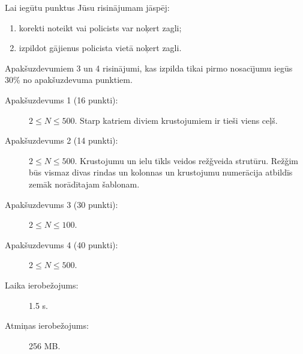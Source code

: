 \documentclass{boi2014-lv}
\begin{document}
    \Scoring
	Lai iegūtu punktus Jūsu risinājumam jāspēj:
    \begin{enumerate}
    	\item korekti noteikt vai policists var noķert zagli;%
	\item izpildot gājienus policista vietā noķert zagli.%
    \end{enumerate}
    
	Apakšuzdevumiem 3 un 4 risinājumi, kas izpilda tikai pirmo nosacījumu iegūs 30\% no apakšuzdevuma punktiem.

    \begin{description}
        \item[Apakšuzdevums 1 (16 punkti):] $2 \le N \le 500$. Starp katriem diviem krustojumiem ir tieši viens ceļš.%
        \item[Apakšuzdevums 2 (14 punkti):] $2 \le N \le 500$.  Krustojumu un ielu tīkls veidos rež\v{g}veida strutūru. Rež\v{g}im būs vismaz divas rindas un kolonnas un krustojumu numerācija atbildīs zemāk norādītajam šablonam.
        \begin{figure}[h!]
           \centering
        \end{figure}
        \item[Apakšuzdevums 3 (30 punkti):] $2 \le N \le 100$.
        \item[Apakšuzdevums 4 (40 punkti):] $2 \le N \le 500$.
    \end{description}

    \Constraints
    
    \begin{description}
        \item[Laika ierobežojums:] 1.5 s.
        \item[Atmiņas ierobežojums:] 256 MB.
    \end{description}
\end{document}

